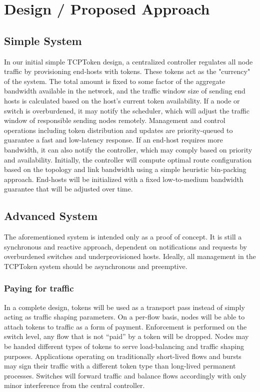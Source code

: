 \section{Design / Proposed Approach}
\label{sec:design}

\subsection{Simple System}
In our initial simple TCPToken design, a centralized controller regulates all node traffic by provisioning end-hosts with tokens.
These tokens act as the "currency" of the system. The total amount is fixed to some factor of the aggregate bandwidth available in the network, and the traffic window size of sending end hosts is calculated based on the host's current token availability. If a node or switch is overburdened, it may notify the scheduler, which will adjust the traffic window of responsible sending nodes remotely. Management and control operations including token distribution and updates are priority-queued to guarantee a fast and low-latency response. If an end-host requires more bandwidth, it can also notify the controller, which may comply based on priority and availability.
Initially, the controller will compute optimal route configuration based on the topology and link bandwidth using a simple heuristic bin-packing approach. End-hosts will be initialized with a fixed low-to-medium bandwidth guarantee that will be adjusted over time.

\subsection{Advanced System}
The aforementioned system is intended only as a proof of concept. It is still a  synchronous and reactive approach, dependent on notifications and requests by overburdened switches and underprovisioned hosts. 
Ideally, all management in the TCPToken system should be asynchronous and preemptive. 
\subsubsection{ Paying for traffic}
In a complete design, tokens will be used as a transport pass instead of simply acting as traffic shaping parameters. On a per-flow basis, nodes will be able to attach tokens to traffic as a form of payment. Enforcement is performed on the switch level, any flow that is not “paid” by a token will be dropped. Nodes may be handed different types of tokens to serve load-balancing and traffic shaping purposes. Applications operating on traditionally short-lived flows and bursts may sign their traffic with a different token type than long-lived permanent processes. Switches will forward traffic and balance flows accordingly with only minor interference from the central controller.

